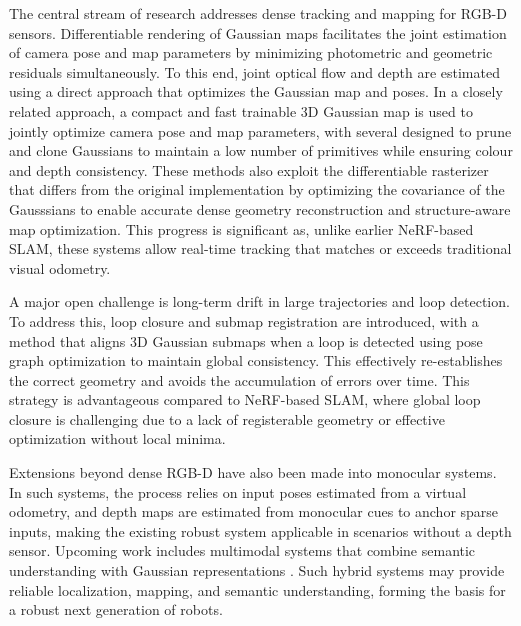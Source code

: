 \documentclass[11pt,a4paper]{article}
\begin{document}
The central stream of research addresses dense tracking and mapping for RGB-D sensors. Differentiable rendering of Gaussian maps facilitates the joint estimation of camera pose and map parameters by minimizing photometric and geometric residuals simultaneously. To this end, joint optical flow and depth are estimated using a direct approach that optimizes the Gaussian map and poses. In a closely related approach, a compact and fast trainable 3D Gaussian map is used to jointly optimize camera pose and map parameters, with several designed to prune and clone Gaussians to maintain a low number of primitives while ensuring colour and depth consistency. These methods also exploit the differentiable rasterizer that differs from the original implementation by optimizing the covariance of the Gausssians to enable accurate dense geometry reconstruction and structure-aware map optimization. This progress is significant as, unlike earlier NeRF-based SLAM, these systems allow real-time tracking that matches or exceeds traditional visual odometry.

A major open challenge is long-term drift in large trajectories and loop detection. To address this, loop closure and submap registration are introduced, with a method that aligns 3D Gaussian submaps when a loop is detected using pose graph optimization to maintain global consistency. This effectively re-establishes the correct geometry and avoids the accumulation of errors over time. This strategy is advantageous compared to NeRF-based SLAM, where global loop closure is challenging due to a lack of registerable geometry or effective optimization without local minima.

Extensions beyond dense RGB-D have also been made into monocular systems. In such systems, the process relies on input poses estimated from a virtual odometry, and depth maps are estimated from monocular cues to anchor sparse inputs, making the existing robust system applicable in scenarios without a depth sensor. Upcoming work includes multimodal systems that combine semantic understanding with Gaussian representations \cite{arxiv:2312.06741v2}. Such hybrid systems may provide reliable localization, mapping, and semantic understanding, forming the basis for a robust next generation of robots.
\end{document}
